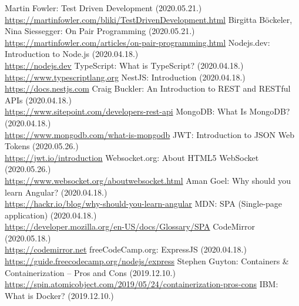 \documentclass{elteikthesis}
\begin{document}
	\begin{thebibliography}{99}


			Martin Fowler: Test Driven Development (2020.05.21.)
			\\\url{https://martinfowler.com/bliki/TestDrivenDevelopment.html}
			Birgitta Böckeler, Nina Siessegger: On Pair Programming (2020.05.21.)
			\\\url{https://martinfowler.com/articles/on-pair-programming.html}
			Nodejs.dev: Introduction to Node.js (2020.04.18.)
			\\\url{https://nodejs.dev}
			TypeScript: What is TypeScript? (2020.04.18.)
			\\\url{https://www.typescriptlang.org}
			NestJS: Introduction (2020.04.18.)
			\\\url{https://docs.nestjs.com}
			Craig Buckler: An Introduction to REST and RESTful APIs (2020.04.18.)
			\\\url{https://www.sitepoint.com/developers-rest-api}
			MongoDB: What Is MongoDB? (2020.04.18.)
			\\\url{https://www.mongodb.com/what-is-mongodb}
			JWT: Introduction to JSON Web Tokens (2020.05.26.)
			\\\url{https://jwt.io/introduction}
			Websocket.org: About HTML5 WebSocket (2020.05.26.)
			\\\url{https://www.websocket.org/aboutwebsocket.html}
			Aman Goel: Why should you learn Angular? (2020.04.18.)
			\\\url{https://hackr.io/blog/why-should-you-learn-angular}
			MDN: SPA (Single-page application) (2020.04.18.)
			\\\url{https://developer.mozilla.org/en-US/docs/Glossary/SPA}
			CodeMirror (2020.05.18.)
			\\\url{https://codemirror.net}
			freeCodeCamp.org: ExpressJS (2020.04.18.)
			\\\url{https://guide.freecodecamp.org/nodejs/express}
			Stephen Guyton: Containers \& Containerization – Pros and Cons (2019.12.10.)
			\\\url{https://spin.atomicobject.com/2019/05/24/containerization-pros-cons}
			IBM: What is Docker? (2019.12.10.)

\end{thebibliography}
\end{document}
